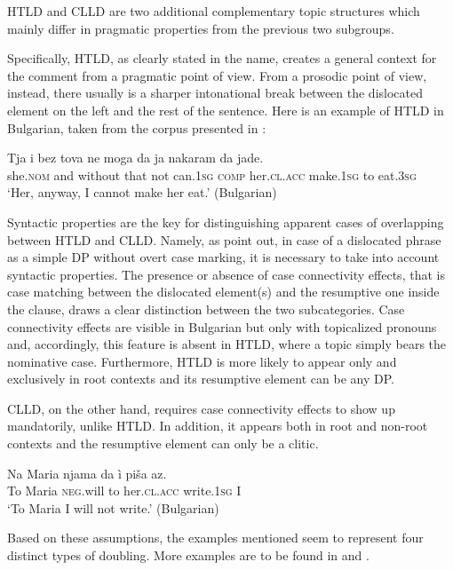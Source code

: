 \documentclass[output=paper,
colorlinks,
citecolor=brown,
newtxmath
]{langscibook}
\begin{document}
\noindent HTLD and CLLD are two additional complementary topic structures which mainly differ in pragmatic properties from the previous two subgroups.

Specifically, HTLD, as clearly stated in the name, creates a general context for the comment from a pragmatic point of view. From a prosodic point of view, instead, there usually is a sharper intonational break between the dislocated element on the left and the rest of the sentence. Here is an example of HTLD in Bulgarian, taken from the corpus presented in \citet{Dzonova2004}:


\ea\label{ex:8}
\gll Tja	 i	 bez     tova ne  moga	  da ja	        nakaram da jade.\\
     she.\textsc{nom} and without that not can.\textsc{1sg} \textsc{comp} her.\textsc{cl.acc} make.\textsc{1sg} to eat.\textsc{3sg}  \\
\glt `Her, anyway, I cannot make her eat.’ \hfill (Bulgarian)
\z

\largerpage[-1]\noindent Syntactic properties are the key for distinguishing apparent cases of overlapping between HTLD and CLLD. Namely, as \citet{Cinque.Krapova2008} point out, in case of a dislocated phrase as a simple DP without overt case marking, it is necessary to take into account syntactic properties. The presence or absence of case connectivity effects, that is case matching between the dislocated element(s) and the resumptive one inside the clause, draws a clear distinction between the two subcategories. Case connectivity effects are visible in Bulgarian but only with topicalized pronouns and, accordingly, this feature is absent in HTLD, where a topic simply bears the nominative case. Furthermore, HTLD is more likely to appear only and exclusively in root contexts and its resumptive element can be any DP.

CLLD, on the other hand, requires case connectivity effects to show up mandatorily, unlike HTLD. In addition, it appears both in root and non-root contexts and the resumptive element can only be a clitic.


\ea\label{ex:9}
\gll Na Maria  njama    da  ì           piša       az.\\
     To Maria  \textsc{neg}.will to  her.\textsc{cl.acc}  write.\textsc{1sg}  I\\
\glt `To Maria I will not write.’
\hfill (Bulgarian)
\z

\noindent Based on these assumptions, the examples mentioned seem to represent four distinct types of doubling. More examples are to be found in \citet{Krapova.Karastaneva2002} and \citet{Cinque.Krapova2008}.
\end{document}
